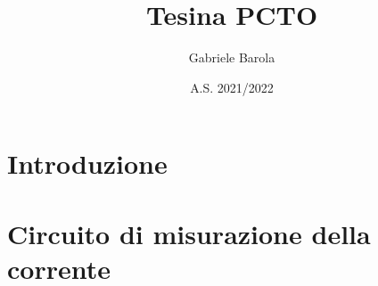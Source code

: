\documentclass{article}
\title{Tesina PCTO}
\author{Gabriele Barola}
\date{A.S. 2021/2022}
\begin{document}
\maketitle
\tableofcontents

\section{Introduzione}




\section{Circuito di misurazione della corrente}




\end{document}
